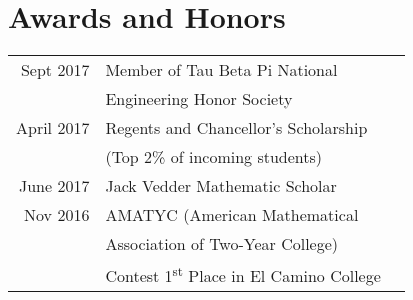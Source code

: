 \documentclass{tccv}
\begin{document}
\section{Awards and Honors}
\begin{tabular}{rll}
Sept 2017 & Member of Tau Beta Pi National\\
&Engineering Honor Society \medskip\\
April 2017 & Regents and Chancellor’s Scholarship\\
&(Top 2\% of incoming students)\medskip\\
June 2017 & Jack Vedder Mathematic Scholar\medskip\\
Nov 2016 & AMATYC (American Mathematical\\
&Association of Two-Year College)\\
&Contest 1\textsuperscript{st} Place in El Camino College
\end{tabular}
\end{document}
